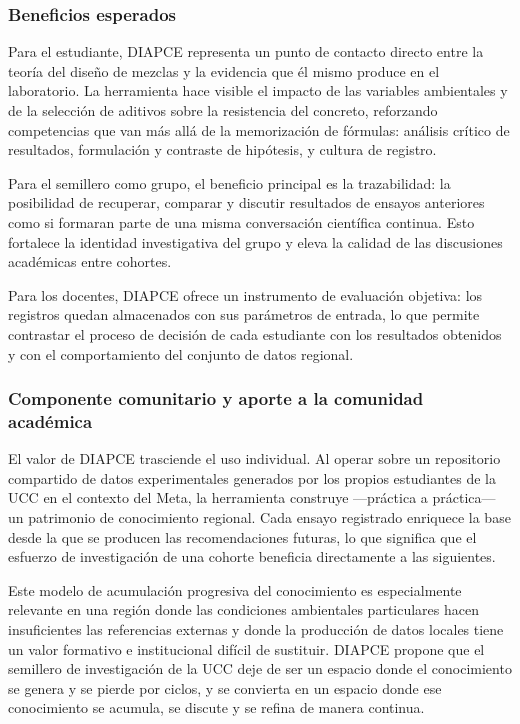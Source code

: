 \documentclass[12pt, letterpaper]{article}
\begin{document}
\subsubsection*{Beneficios esperados}

Para el estudiante, DIAPCE representa un punto de contacto directo entre la teoría del diseño de mezclas y la evidencia que él mismo produce en el laboratorio. La herramienta hace visible el impacto de las variables ambientales y de la selección de aditivos sobre la resistencia del concreto, reforzando competencias que van más allá de la memorización de fórmulas: análisis crítico de resultados, formulación y contraste de hipótesis, y cultura de registro.

Para el semillero como grupo, el beneficio principal es la trazabilidad: la posibilidad de recuperar, comparar y discutir resultados de ensayos anteriores como si formaran parte de una misma conversación científica continua. Esto fortalece la identidad investigativa del grupo y eleva la calidad de las discusiones académicas entre cohortes.

Para los docentes, DIAPCE ofrece un instrumento de evaluación objetiva: los registros quedan almacenados con sus parámetros de entrada, lo que permite contrastar el proceso de decisión de cada estudiante con los resultados obtenidos y con el comportamiento del conjunto de datos regional.

\subsubsection*{Componente comunitario y aporte a la comunidad académica}

El valor de DIAPCE trasciende el uso individual. Al operar sobre un repositorio compartido de datos experimentales generados por los propios estudiantes de la UCC en el contexto del Meta, la herramienta construye ---práctica a práctica--- un patrimonio de conocimiento regional. Cada ensayo registrado enriquece la base desde la que se producen las recomendaciones futuras, lo que significa que el esfuerzo de investigación de una cohorte beneficia directamente a las siguientes.

Este modelo de acumulación progresiva del conocimiento es especialmente relevante en una región donde las condiciones ambientales particulares hacen insuficientes las referencias externas y donde la producción de datos locales tiene un valor formativo e institucional difícil de sustituir. DIAPCE propone que el semillero de investigación de la UCC deje de ser un espacio donde el conocimiento se genera y se pierde por ciclos, y se convierta en un espacio donde ese conocimiento se acumula, se discute y se refina de manera continua.
\end{document}
